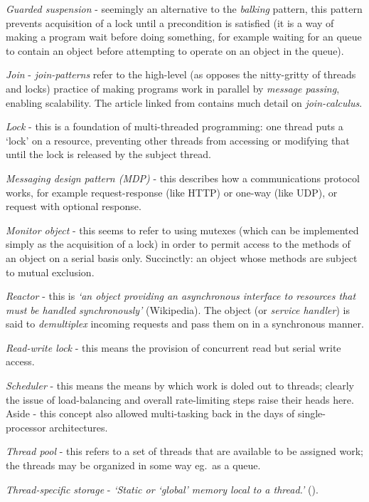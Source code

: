 {\it Guarded suspension} - seemingly an alternative to the {\it balking} pattern, this pattern prevents acquisition of a lock until a precondition is satisfied (it is a way of making a program wait before doing something, for example waiting for an queue to contain an object before attempting to operate on an object in the queue).

{\it Join} - {\it join-patterns} refer to the high-level (as opposes the nitty-gritty of threads and locks) practice of making programs work in parallel by {\it message passing}, enabling scalability.  
The article linked from \cite{softwarepatternwiki} contains much detail on {\it join-calculus}.

{\it Lock} - this is a foundation of multi-threaded programming: one thread puts a `lock' on a resource, preventing other threads from accessing or modifying that until the lock is released by the subject thread.

{\it Messaging design pattern (MDP)} - this describes how a communications protocol works, for example request-response (like HTTP) or one-way (like UDP), or request with optional response. 

{\it Monitor object} - this seems to refer to using mutexes (which can be implemented simply as the acquisition of a lock) in order to permit access to the methods of an object on a serial basis only.  
Succinctly: an object whose methods are subject to mutual exclusion.

{\it Reactor} - this is {\it`an object providing an asynchronous interface to resources that must be handled synchronously'} (Wikipedia).  
The object (or {\it service handler}) is said to {\it demultiplex} incoming requests and pass them on in a synchronous manner.

{\it Read-write lock} - this means the provision of concurrent read but serial write access.

{\it Scheduler} - this means the means by which work is doled out to threads; clearly the issue of load-balancing and overall rate-limiting steps raise their heads here.  
Aside - this concept also allowed multi-tasking back in the days of single-processor architectures.

{\it Thread pool} - this refers to a set of threads that are available to be assigned work; the threads may be organized in some way eg.\ as a queue.

{\it Thread-specific storage} - {\it`Static or `global' memory local to a thread.'} (\cite{softwarepatternwiki}).


